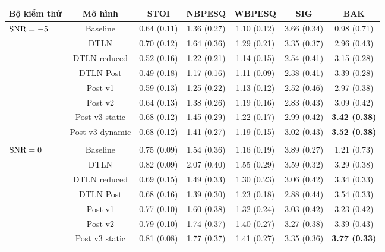 		\begin{table}[h]
			\centering
			\begin{tabular}{l c c c c c c}
				\hline
				\multicolumn{1}{c}{\textbf{Bộ kiểm thử}}	& \textbf{Mô hình}	& \textbf{STOI}	& \textbf{NBPESQ}	& \textbf{WBPESQ}	& \textbf{SIG}	& \textbf{BAK} \\
				\hline
				\multirow{8}{*}{$\text{SNR}=-5$}        &Baseline       & 0.64 (0.11)   & 1.36 (0.27)   & 1.10 (0.12)   & 3.66 (0.34)   & 0.98 (0.71) \\
				&DTLN   & 0.70 (0.12)   & 1.64 (0.36)   & 1.29 (0.21)   & 3.35 (0.37)   & 2.96 (0.43) \\
				&DTLN reduced   & 0.52 (0.16)   & 1.22 (0.21)   & 1.14 (0.15)   & 2.54 (0.41)   & 3.15 (0.28) \\
				&DTLN Post      & 0.49 (0.18)   & 1.17 (0.16)   & 1.11 (0.09)   & 2.38 (0.41)   & 3.39 (0.28) \\
				&Post v1        & 0.59 (0.13)   & 1.25 (0.22)   & 1.13 (0.12)   & 2.52 (0.46)   & 2.97 (0.38) \\
				&Post v2        & 0.64 (0.13)   & 1.38 (0.26)   & 1.19 (0.16)   & 2.83 (0.43)   & 3.09 (0.42) \\
				&Post v3 static & 0.68 (0.12)   & 1.45 (0.29)   & 1.22 (0.17)   & 2.99 (0.42)   & \textbf{3.42 (0.38)} \\
				&Post v3 dynamic        & 0.68 (0.12)   & 1.41 (0.27)   & 1.19 (0.15)   & 3.02 (0.43)   & \textbf{3.52 (0.38)} \\
				&&&&&&\\
				\multirow{8}{*}{$\text{SNR}=0$}         &Baseline       & 0.75 (0.09)   & 1.54 (0.36)   & 1.16 (0.19)   & 3.89 (0.27)   & 1.21 (0.73) \\
				&DTLN   & 0.82 (0.09)   & 2.07 (0.40)   & 1.55 (0.29)   & 3.59 (0.32)   & 3.29 (0.38) \\
				&DTLN reduced   & 0.69 (0.15)   & 1.49 (0.33)   & 1.30 (0.23)   & 3.06 (0.42)   & 3.34 (0.33) \\
				&DTLN Post      & 0.68 (0.16)   & 1.39 (0.30)   & 1.23 (0.18)   & 2.88 (0.44)   & 3.54 (0.33) \\
				&Post v1        & 0.77 (0.10)   & 1.60 (0.38)   & 1.32 (0.24)   & 3.03 (0.42)   & 3.23 (0.42) \\
				&Post v2        & 0.79 (0.10)   & 1.74 (0.37)   & 1.40 (0.27)   & 3.27 (0.38)   & 3.39 (0.43) \\
				&Post v3 static & 0.81 (0.08)   & 1.77 (0.37)   & 1.41 (0.27)   & 3.35 (0.36)   & \textbf{3.77 (0.33)} \\

\end{tabular}
\end{table}
